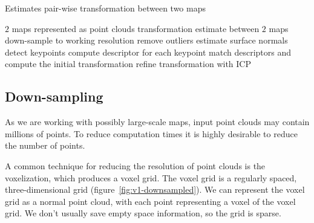 \begin{algorithm}
    \caption[Pair-wise transformation estimation]{Estimates pair-wise transformation between two maps}
    \label{alg:estimate-pair}
    \begin{algorithmic}[1]
        \Require $2$ maps represented as point clouds
        \Ensure transformation estimate between $2$ maps
            \State down-sample to working resolution
            \State remove outliers
            \State estimate surface normals
            \State detect keypoints
            \State compute descriptor for each keypoint
            \State match descriptors and compute the initial transformation
            \State refine transformation with \gls{ICP}
        \EndProcedure
    \end{algorithmic}
\end{algorithm}

\subsection{Down-sampling}
\label{sec:downsampling}

As we are working with possibly large-scale maps, input point clouds may contain millions of points. To reduce computation times it is highly desirable to reduce the number of points.

A common technique for reducing the resolution of point clouds is the voxelization, which produces a voxel grid. The voxel grid is a regularly spaced, three-dimensional grid (figure~\ref{fig:v1-downsampled}). We can represent the voxel grid as a normal point cloud, with each point representing a voxel of the voxel grid. We don't usually save empty space information, so the grid is sparse.

